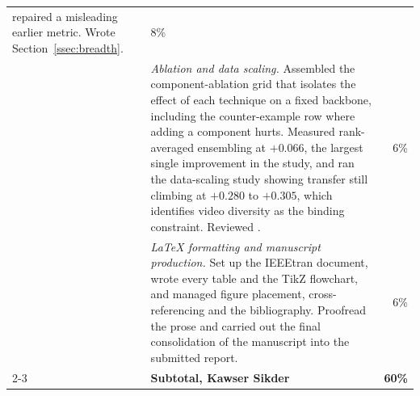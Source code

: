\documentclass[journal,onecolumn]{IEEEtran}
\begin{document}
{\begin{longtable}{p{30mm}p{88mm}r}
repaired a misleading earlier metric. Wrote Section~\ref{ssec:breadth}. & 8\% \\
\addlinespace
&
\emph{Ablation and data scaling.} Assembled the component-ablation grid that
isolates the effect of each technique on a fixed backbone, including the
counter-example row where adding a component hurts. Measured rank-averaged
ensembling at $+0.066$, the largest single improvement in the study, and ran the
data-scaling study showing transfer still climbing at $+0.280$ to $+0.305$, which
identifies video diversity as the binding constraint. Reviewed
\cite{qian2020f3net}. & 6\% \\
\addlinespace
&
\emph{\LaTeX{} formatting and manuscript production.} Set up the IEEEtran
document, wrote every table and the TikZ flowchart, and managed figure placement,
cross-referencing and the bibliography. Proofread the prose and carried out the final consolidation of the manuscript into the
submitted report. & 6\% \\
\cmidrule(l){2-3}
& \textbf{Subtotal, Kawser Sikder} & \textbf{60\%} \\
\midrule


\end{longtable}}
\end{document}
